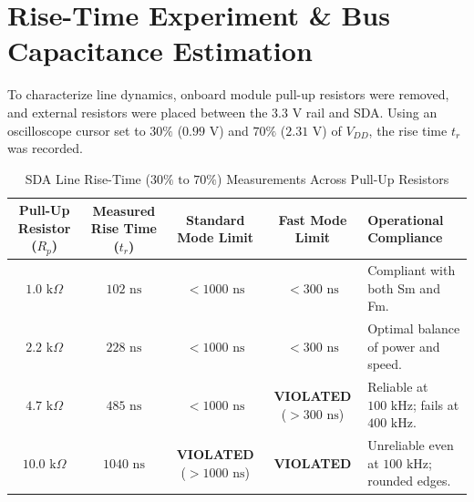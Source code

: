 \documentclass[11pt,a4paper]{article}
\begin{document}
\section{Rise-Time Experiment \& Bus Capacitance Estimation}
To characterize line dynamics, onboard module pull-up resistors were removed, and external resistors were placed between the $3.3\text{ V}$ rail and SDA. Using an oscilloscope cursor set to $30\%$ ($0.99\text{ V}$) and $70\%$ ($2.31\text{ V}$) of $V_{DD}$, the rise time $t_r$ was recorded.

\begin{table}[h!]
\centering
\small
\caption{SDA Line Rise-Time ($30\%\text{ to }70\%$) Measurements Across Pull-Up Resistors}
\vspace{4pt}
\begin{tabularx}{\textwidth}{c c c c X}
\toprule
\textbf{Pull-Up Resistor ($R_p$)} & \textbf{Measured Rise Time ($t_r$)} & \textbf{Standard Mode Limit} & \textbf{Fast Mode Limit} & \textbf{Operational Compliance} \\
\midrule
$1.0\text{ k}\Omega$ & $102\text{ ns}$ & $< 1000\text{ ns}$ & $< 300\text{ ns}$ & Compliant with both Sm and Fm. \\
$2.2\text{ k}\Omega$ & $228\text{ ns}$ & $< 1000\text{ ns}$ & $< 300\text{ ns}$ & Optimal balance of power and speed. \\
$4.7\text{ k}\Omega$ & $485\text{ ns}$ & $< 1000\text{ ns}$ & \textbf{VIOLATED} ($> 300\text{ ns}$) & Reliable at $100\text{ kHz}$; fails at $400\text{ kHz}$. \\
$10.0\text{ k}\Omega$ & $1040\text{ ns}$ & \textbf{VIOLATED} ($> 1000\text{ ns}$) & \textbf{VIOLATED} & Unreliable even at $100\text{ kHz}$; rounded edges. \\
\bottomrule
\end{tabularx}
\end{table}
\end{document}
